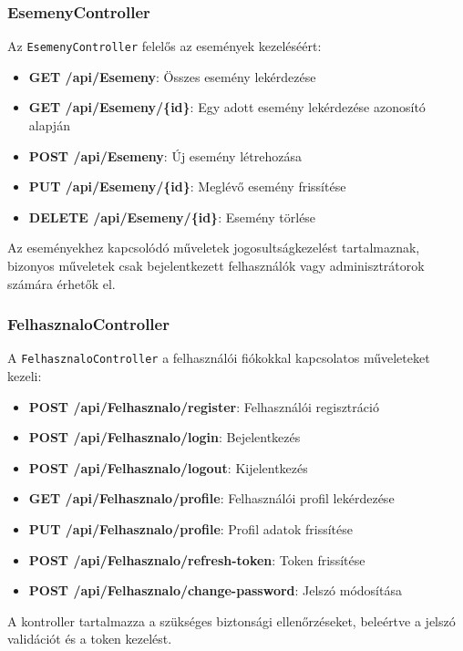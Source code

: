 \documentclass[colorlinks]{thesis-kando}
\theoremstyle{definition}
\theoremstyle{remark}
\begin{document}
 \subsubsection{EsemenyController}
 
 Az \texttt{EsemenyController} felelős az események kezeléséért:
 
 \begin{itemize}
 	\item \textbf{GET /api/Esemeny}: Összes esemény lekérdezése
 	\item \textbf{GET /api/Esemeny/\{id\}}: Egy adott esemény lekérdezése azonosító alapján
 	\item \textbf{POST /api/Esemeny}: Új esemény létrehozása
 	\item \textbf{PUT /api/Esemeny/\{id\}}: Meglévő esemény frissítése
 	\item \textbf{DELETE /api/Esemeny/\{id\}}: Esemény törlése
 \end{itemize}
 
 Az eseményekhez kapcsolódó műveletek jogosultságkezelést tartalmaznak, bizonyos műveletek csak bejelentkezett felhasználók vagy adminisztrátorok számára érhetők el.
 
 \subsubsection{FelhasznaloController}
 
 A \texttt{FelhasznaloController} a felhasználói fiókokkal kapcsolatos műveleteket kezeli:
 
 \begin{itemize}
 	\item \textbf{POST /api/Felhasznalo/register}: Felhasználói regisztráció
 	\item \textbf{POST /api/Felhasznalo/login}: Bejelentkezés
 	\item \textbf{POST /api/Felhasznalo/logout}: Kijelentkezés
 	\item \textbf{GET /api/Felhasznalo/profile}: Felhasználói profil lekérdezése
 	\item \textbf{PUT /api/Felhasznalo/profile}: Profil adatok frissítése
 	\item \textbf{POST /api/Felhasznalo/refresh-token}: Token frissítése
 	\item \textbf{POST /api/Felhasznalo/change-password}: Jelszó módosítása
 \end{itemize}
 
 A kontroller tartalmazza a szükséges biztonsági ellenőrzéseket, beleértve a jelszó validációt és a token kezelést.
 
\end{document}
